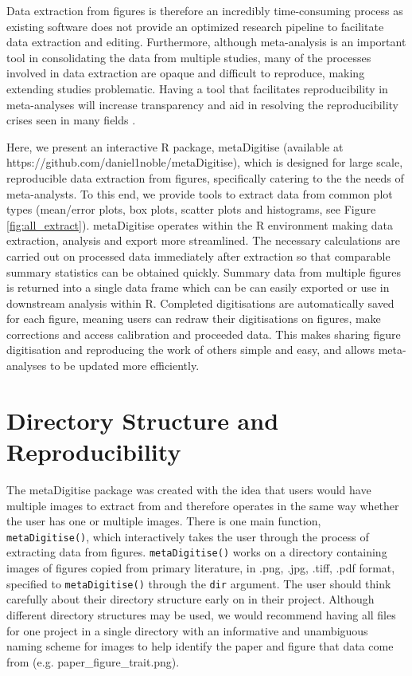 \documentclass[12pt]{article}
\newcommand{\code}[1]{\texttt{#1}}
\newcommand{\fct}[1]{\texttt{#1()}}
\newcommand{\pkg}[1]{{\fontseries{b}\selectfont #1}}
\let\proglang=\textsf
\begin{document}
Data extraction from figures is therefore an incredibly time-consuming process as existing software does not provide an optimized research pipeline to facilitate data extraction and editing. Furthermore, although meta-analysis is an important tool in consolidating the data from multiple studies, many of the processes involved in data extraction are opaque and difficult to reproduce, making extending studies problematic. Having a tool that facilitates reproducibility in meta-analyses will increase transparency and aid in resolving the reproducibility crises seen in many fields \citep{peng_reproducible_2006, peng_reproducible_2011, Parker2016}.

Here, we present an interactive \proglang{R} package, \pkg{metaDigitise} (available at https://github.com/daniel1noble/metaDigitise), which is designed for large scale, reproducible data extraction from figures, specifically catering to the the needs of meta-analysts. To this end, we provide tools to extract data from common plot types (mean/error plots, box plots, scatter plots and histograms, see Figure \ref{fig:all_extract}). \pkg{metaDigitise} operates within the \proglang{R} environment making data extraction, analysis and export more streamlined. The necessary calculations are carried out on processed data immediately after extraction so that comparable summary statistics can be obtained quickly. Summary data from multiple figures is returned into a single data frame which can be can easily exported or use in downstream analysis within \proglang{R}. Completed digitisations are automatically saved for each figure, meaning users can redraw their digitisations on figures, make corrections and access calibration and proceeded data. This makes sharing figure digitisation and reproducing the work of others simple and easy, and allows meta-analyses to be updated more efficiently.




\section{Directory Structure and Reproducibility}
The \pkg{metaDigitise} package was created with the idea that users would have multiple images to extract from and therefore operates in the same way whether the user has one or multiple images. There is one main function, \fct{metaDigitise}, which interactively takes the user through the process of extracting data from figures. \fct{metaDigitise} works on a directory containing images of figures copied from primary literature, in .png, .jpg, .tiff, .pdf format, specified to \fct{metaDigitise} through the \code{dir} argument. The user should think carefully about their directory structure early on in their project. Although different directory structures may be used, we would recommend having all files for one project in a single directory with an informative and unambiguous naming scheme for images to help identify the paper and figure that data come from (e.g. paper\_figure\_trait.png).
\end{document}
